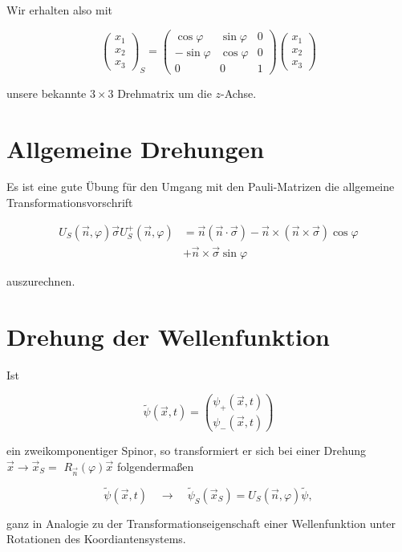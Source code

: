 \documentclass[10pt, letterpaper]{article}
\begin{document}
Wir erhalten also mit

$$
\left(\begin{array}{l}
x_{1} \\
x_{2} \\
x_{3}
\end{array}\right)_{S}=\left(\begin{array}{ccc}
\cos \varphi & \sin \varphi & 0 \\
-\sin \varphi & \cos \varphi & 0 \\
0 & 0 & 1
\end{array}\right)\left(\begin{array}{l}
x_{1} \\
x_{2} \\
x_{3}
\end{array}\right)
$$

unsere bekannte $3 \times 3$ Drehmatrix um die $z$-Achse.

\section*{Allgemeine Drehungen}
Es ist eine gute Übung für den Umgang mit den Pauli-Matrizen die allgemeine Transformationsvorschrift

$$
\begin{aligned}
U_{S}(\vec{n}, \varphi) \vec{\sigma} U_{S}^{+}(\vec{n}, \varphi) & =\vec{n}(\vec{n} \cdot \vec{\sigma})-\vec{n} \times(\vec{n} \times \vec{\sigma}) \cos \varphi \\
& +\vec{n} \times \vec{\sigma} \sin \varphi
\end{aligned}
$$

auszurechnen.

\section*{Drehung der Wellenfunktion}
Ist

$$
\widetilde{\psi}(\vec{x}, t)=\binom{\psi_{+}(\vec{x}, t)}{\psi_{-}(\vec{x}, t)}
$$

ein zweikomponentiger Spinor, so transformiert er sich bei einer Drehung $\vec{x} \rightarrow \vec{x}_{S}=$ $R_{\vec{n}}(\varphi) \vec{x}$ folgendermaßen

$$
\tilde{\psi}(\vec{x}, t) \quad \rightarrow \quad \tilde{\psi}_{S}\left(\vec{x}_{S}\right)=U_{S}(\vec{n}, \varphi) \tilde{\psi},
$$

ganz in Analogie zu der Transformationseigenschaft einer Wellenfunktion unter Rotationen des Koordiantensystems.
\end{document}
